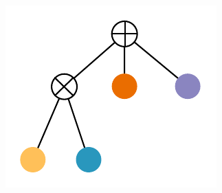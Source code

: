 \documentclass[final]{beamer}
\begin{document}
\begin{frame}{}
\begin{textblock}{80}
{\begin{minipage}[t]{6.48cm}
      \includegraphics[width=\linewidth]{figures/learnspn-2}
    \end{minipage}}\hspace{30pt}\begin{minipage}[t]{5.1516cm}

\end{minipage}
\end{textblock}
\end{frame}
\end{document}
